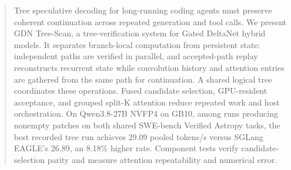 \begin{abstract}
Tree speculative decoding for long-running coding agents must preserve coherent continuation across repeated generation and tool calls. We present GDN Tree-Scan, a tree-verification system for Gated DeltaNet hybrid models. It separates branch-local computation from persistent state: independent paths are verified in parallel, and accepted-path replay reconstructs recurrent state while convolution history and attention entries are gathered from the same path for continuation. A shared logical tree coordinates these operations. Fused candidate selection, GPU-resident acceptance, and grouped split-K attention reduce repeated work and host orchestration. On Qwen3.8-27B NVFP4 on GB10, among runs producing nonempty patches on both shared SWE-bench Verified Astropy tasks, the best recorded tree run achieves 29.09 pooled tokens/s versus SGLang EAGLE's 26.89, an 8.18\% higher rate. Component tests verify candidate-selection parity and measure attention repeatability and numerical error.
\end{abstract}
